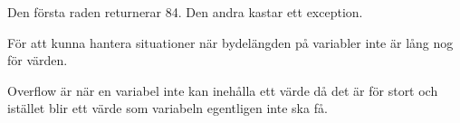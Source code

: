 


\noindent{}


\AdvancedTasks %



\Task %

\Subtask 
Den första raden returnerar 84. Den andra kastar ett exception.

\Subtask
För att kunna hantera situationer när bydelängden på variabler inte är lång nog för värden.

\Subtask
Overflow är när en variabel inte kan inehålla ett värde då det är för stort och istället  blir ett värde som variabeln egentligen inte ska få.

\Task %

\Subtask
{}

\Subtask
{}

\Subtask
{}

\Task %

\Task %







